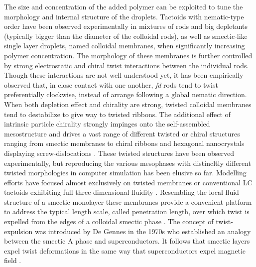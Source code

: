  The size and concentration of the added polymer can be exploited to  tune the morphology and internal structure of the droplets. Tactoids with nematic-type order have been observed experimentally in mixtures of rods and big depletants (typically bigger than the diameter of the colloidal rods), as well as smectic-like single layer droplets, named colloidal membranes, when significantly increasing polymer concentration. The morphology of these membranes is further controlled by strong electrostatic and chiral twist interactions between the individual rods. Though these interactions are not well understood yet, it has been empirically observed that, in close contact with one another, {\em fd} rods tend to twist preferentially clockwise, instead of arrange following a global nematic direction. When both depletion effect and chirality are strong, twisted colloidal membranes tend to destabilize to give way to twisted ribbons. The additional effect of intrinsic particle chirality strongly impinges  onto the self-assembled mesostructure and drives a vast range of different twisted or chiral structures ranging from smectic membranes to chiral ribbons  \cite{Gibaud2012} and hexagonal nanocrystals displaying screw-dislocations \cite{grelet1}. These twisted structures have been observed experimentally, but reproducing the various mesophases with distincltly different twisted morphologies in computer simulation has been elusive so far.  Modelling efforts have focused almost exclusively on twisted membranes \cite{kang_sm2016,wensink2018elastic,kuhnhold2022colloidal} or conventional LC tactoids exhibiting full three-dimensional fluidity \cite{prinsen2003shape,prinsen2004parity,kuhnhold2022structure}. Resembling the local fluid structure of a smectic monolayer these membranes  provide a convenient platform  to address the typical length scale, called penetration length, over which twist is expelled from the edges of a colloidal smectic phase \cite{barry_jpcb2009}. The concept of twist-expulsion was introduced by De Gennes in the 1970s who established an analogy between the smectic A phase and superconductors. It follows that smectic layers expel twist deformations in the same way that superconductors expel magnetic field \cite{gennes-prost}.



